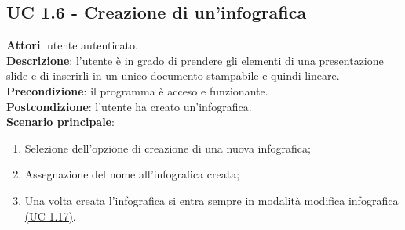 \subsection{UC 1.6 - Creazione di un'infografica}{
	\label{uc1.6}
	\textbf{Attori}: utente autenticato. \\
	\textbf{Descrizione}: l'utente è in grado di prendere gli elementi di una presentazione slide e di inserirli in un unico documento stampabile e quindi lineare. \\
	\textbf{Precondizione}: il programma è acceso e funzionante.	\\
	\textbf{Postcondizione}: l'utente ha creato un'infografica.	\\
	\textbf{Scenario principale}:
	\begin{enumerate}
		\item Selezione dell'opzione di creazione di una nuova infografica;
		\item Assegnazione del nome all'infografica creata;
		\item Una volta creata l'infografica si entra sempre in modalità modifica infografica \hyperref[uc1.17]{(UC 1.17)}.
	\end{enumerate}
	}
